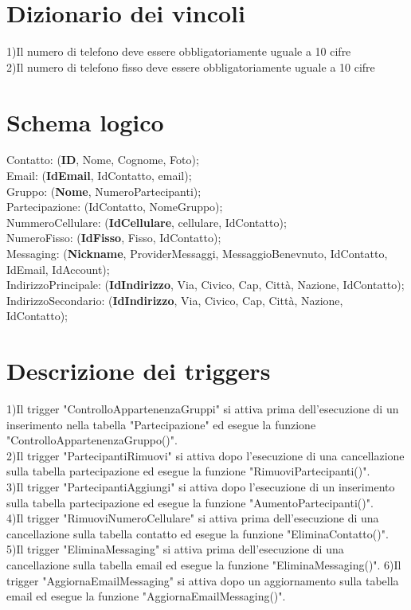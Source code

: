 \documentclass{article}
\begin{document}
    \section{\LARGE Dizionario dei vincoli}
    1)Il numero di telefono deve essere obbligatoriamente uguale a 10 cifre\\
    2)Il numero di telefono fisso deve essere  obbligatoriamente uguale a 10 cifre
    \section{\LARGE Schema logico}
    Contatto: (\textbf{ID}, Nome, Cognome, Foto);\\
    Email: (\textbf{IdEmail}, IdContatto, email);\\
    Gruppo: (\textbf{Nome}, NumeroPartecipanti);\\
    Partecipazione: (IdContatto, NomeGruppo);\\
    NummeroCellulare: (\textbf{IdCellulare}, cellulare, IdContatto);\\
    NumeroFisso: (\textbf{IdFisso}, Fisso,  IdContatto);\\
    Messaging: (\textbf{Nickname}, ProviderMessaggi, MessaggioBenevnuto, IdContatto, IdEmail, IdAccount);\\
    IndirizzoPrincipale: (\textbf{IdIndirizzo}, Via, Civico, Cap, Città, Nazione, IdContatto);\\
    IndirizzoSecondario: (\textbf{IdIndirizzo}, Via, Civico, Cap, Città, Nazione, IdContatto);

    \newpage
    \section{\LARGE Descrizione dei triggers}
    1)Il trigger "ControlloAppartenenzaGruppi" si attiva prima dell'esecuzione di un 
    inserimento nella tabella "Partecipazione" ed esegue la funzione "ControlloAppartenenzaGruppo()".\\
    2)Il trigger "PartecipantiRimuovi" si attiva dopo l'esecuzione di una cancellazione
    sulla tabella partecipazione ed esegue la funzione "RimuoviPartecipanti()".\\
    3)Il trigger "PartecipantiAggiungi" si attiva dopo l'esecuzione di un inserimento
    sulla tabella partecipazione ed esegue la funzione "AumentoPartecipanti()".\\
    4)Il trigger "RimuoviNumeroCellulare" si attiva prima dell'esecuzione di una cancellazione sulla tabella 
    contatto ed esegue la funzione "EliminaContatto()".
    5)Il trigger "EliminaMessaging" si attiva prima dell'esecuzione di una cancellazione sulla tabella email
    ed esegue la funzione "EliminaMessaging()".
    6)Il trigger "AggiornaEmailMessaging" si attiva dopo un aggiornamento sulla tabella email ed esegue la funzione
    "AggiornaEmailMessaging()".
\end{document}

